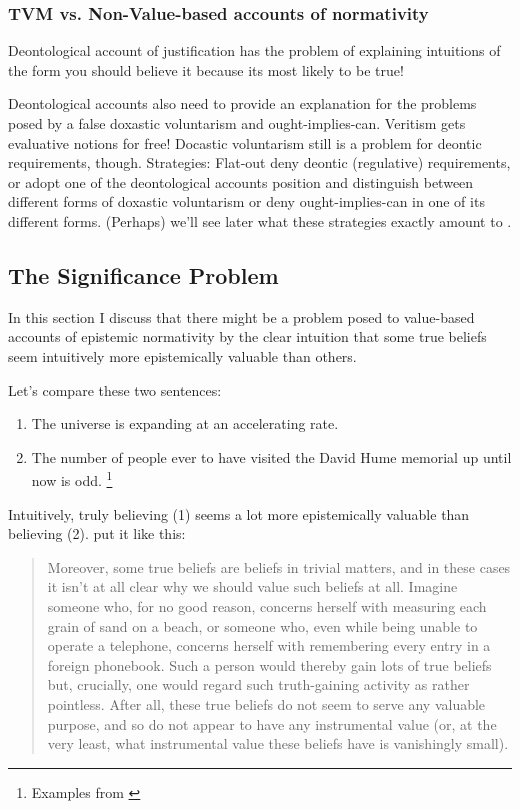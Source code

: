 \documentclass[12pt,numbers=noenddot]{scrartcl}
\begin{document}
\subsubsection{ TVM vs. Non-Value-based accounts of normativity }
    Deontological account of justification has the problem of explaining intuitions of the form you should believe it because its most likely to be true!

    Deontological accounts also need to provide an explanation for the problems posed by a false doxastic voluntarism and ought-implies-can. Veritism gets evaluative notions for free! Docastic voluntarism still is a problem for deontic requirements, though. Strategies: Flat-out deny deontic (regulative) requirements, or adopt one of the deontological accounts position and distinguish between different forms of doxastic voluntarism or deny ought-implies-can in one of its different forms. (Perhaps) we'll see later what these strategies exactly amount to .

\subsection{The Significance Problem}

In this section I discuss that there might be a problem posed to value-based accounts of epistemic normativity by the clear intuition that some true beliefs seem intuitively more epistemically valuable than others.

Let's compare these two sentences:
\begin{enumerate}
    \item The universe is expanding at an accelerating rate.
    \item The number of people ever to have visited the David Hume memorial up until now is odd. \footnote{Examples from \textcite{Ahlstrom-Vij2013}}
\end{enumerate}

Intuitively, truly believing (1) seems a lot more epistemically valuable than believing (2). \textcite{sep-knowledge-value} put it like this:

\begin{quote}
    Moreover, some true beliefs are beliefs in trivial matters, and in these cases it isn't at all clear why we should value such beliefs at all. Imagine someone who, for no good reason, concerns herself with measuring each grain of sand on a beach, or someone who, even while being unable to operate a telephone, concerns herself with remembering every entry in a foreign phonebook. Such a person would thereby gain lots of true beliefs but, crucially, one would regard such truth-gaining activity as rather pointless. After all, these true beliefs do not seem to serve any valuable purpose, and so do not appear to have any instrumental value (or, at the very least, what instrumental value these beliefs have is vanishingly small).
\end{quote}
\end{document}

